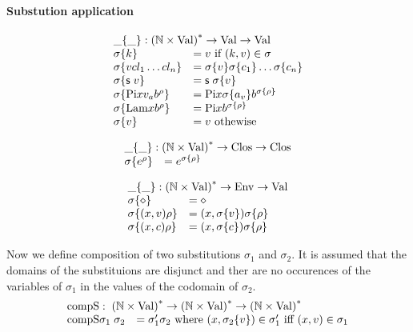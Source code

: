 \paragraph*{Substution application}
\[
\begin{array}{ll}
\multicolumn{2}{l}{\subst{\_}{\_} : \ves{(\cN \times \Val)} \ra \Val \ra \Val} \\
\subst{\sigma}{k} & = v \mbox{ if } (k,v) \in \sigma \\
\subst{\sigma}{v cl_1 \ldots cl_n} & = \subst{\sigma}{v} \substClos{\sigma}{c_1} \ldots \substClos{\sigma}{c_n}\\
\subst{\sigma}{\s v} & = \s \subst{\sigma}{v} \\
\subst{\sigma}{\vpi x v_a \cl{b}{\rho}} & = \vpi x \subst{\sigma}{a_v} \cl{b}{\subst{\sigma}{\rho}} \\
\subst{\sigma}{\vlam x \cl{b}{\rho}} & = \vpi x \cl{b}{\subst{\sigma}{\rho}} \\
\subst{\sigma}{v} & = v \mbox{ othewise }
\end{array}
\]

\[
\begin{array}{ll}
\multicolumn{2}{l}{\substClos{\_}{\_} : \ves{(\cN \times \Val)} \ra \Clos \ra \Clos} \\
\substClos{\sigma}{\cl{e}{\rho}} & = \cl{e}{\substEnv{\sigma}{\rho}} 
\end{array}
\]


\[
\begin{array}{ll}
\multicolumn{2}{l}{\substEnv{\_}{\_} : \ves{(\cN \times \Val)} \ra \Env \ra \Val} \\
\substEnv{\sigma}{\diamond} & = \diamond \\
\substEnv{\sigma}{(x,v)\rho} & = (x,\subst{\sigma}{v}) \substEnv{\sigma}{\rho} \\
\substEnv{\sigma}{(x,c)\rho} & = (x,\substClos{\sigma}{c}) \substEnv{\sigma}{\rho}
\end{array}
\]

Now we define composition of two substitutions $\sigma_1$ and $\sigma_2$.
It is assumed that the domains of the substituions are disjunct and
ther are no occurences of the variables of $\sigma_1$ in the values of the codomain of $\sigma_2$.  
\[
\begin{array}{ll}
\multicolumn{2}{l}{\compS : \ves{(\cN \times \Val)} \ra \ves{(\cN \times \Val)} \ra \ves{(\cN \times \Val)}} \\
\compS{\sigma_1}{\sigma_2} & =  \sigma'_1 \sigma_2 \mbox{ where } (x,\subst{\sigma_2}{v}) \in \sigma'_1 \mbox{ iff } (x,v) \in \sigma_1 \\
\end{array}
\]



